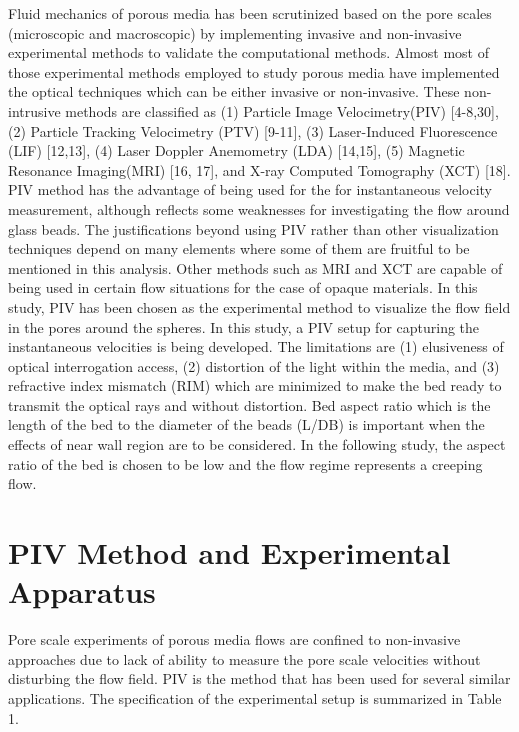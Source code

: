 \documentclass[letterpaper,12pt,titlepage,fleqn]{article}
\begin{document}
\begin{CJK}{UTF8}{gkai}
Fluid mechanics of porous media has been scrutinized based on the pore scales (microscopic and macroscopic) by implementing invasive and non-invasive experimental methods to validate the computational methods. Almost most of those experimental methods employed to study porous media have implemented the optical techniques which can be either invasive or non-invasive.  These non-intrusive methods are classified as (1) Particle Image Velocimetry(PIV) [4-8,30], (2) Particle Tracking Velocimetry (PTV) [9-11], (3) Laser-Induced Fluorescence (LIF) [12,13], (4) Laser Doppler Anemometry (LDA) [14,15], (5) Magnetic Resonance Imaging(MRI) [16, 17], and X-ray Computed Tomography (XCT) [18]. PIV method has the advantage of being used for the for instantaneous velocity measurement, although reflects some weaknesses for investigating the flow around glass beads. The justifications beyond using PIV rather than other visualization techniques depend on many elements where some of them are fruitful to be mentioned in this analysis. Other methods such as MRI and XCT are capable of being used in certain flow situations for the case of opaque materials. In this study, PIV has been chosen as the experimental method to visualize the flow field in the pores around the spheres. In this study, a PIV setup for capturing the instantaneous velocities is being developed. The limitations are (1) elusiveness of optical interrogation access, (2) distortion of the light within the media, and (3) refractive index mismatch (RIM) which are minimized to make the bed ready to transmit the optical rays and without distortion. Bed aspect ratio which is the length of the bed to the diameter of the beads (L/DB) is important when the effects of near wall region are to be considered. In the following study, the aspect ratio of the bed is chosen to be low and the flow regime represents a creeping flow.

\section{PIV Method and Experimental Apparatus}

Pore scale experiments of porous media flows are confined to non-invasive approaches due to lack of ability to measure the pore scale velocities without disturbing the flow field. PIV is the method that has been used for several similar applications. The specification of the experimental setup is summarized in Table 1. 
\clearpage


\end{CJK}
\end{document}
